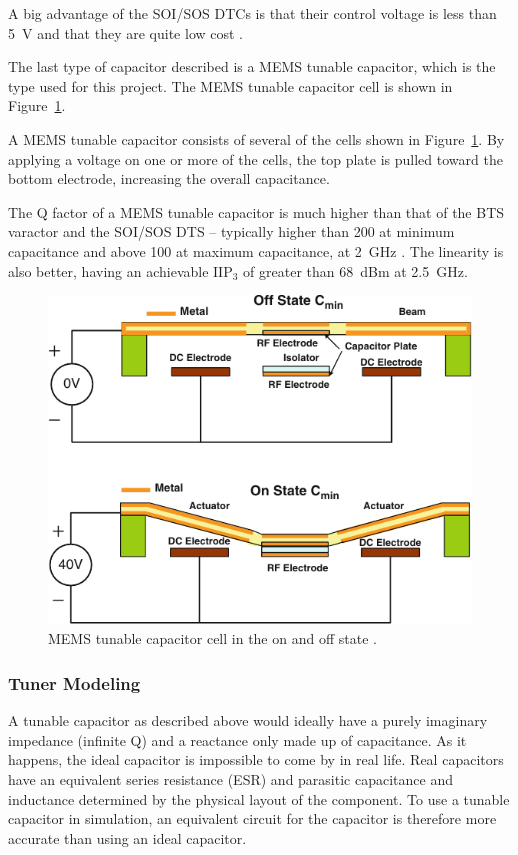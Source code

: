 A big advantage of the SOI/SOS DTCs is that their control voltage is less than \SI{5}{V} and that they are quite low cost \cite{gu2014rf}.

The last type of capacitor described is a MEMS tunable capacitor, which is the type used for this project. The MEMS tunable capacitor cell is shown in Figure~\ref{fig:memscap}.

A MEMS tunable capacitor consists of several of the cells shown in Figure~\ref{fig:memscap}. By applying a voltage on one or more of the cells, the top plate is pulled toward the bottom electrode, increasing the overall capacitance. 

The Q factor of a MEMS tunable capacitor is much higher than that of the BTS varactor and the SOI/SOS DTS -- typically higher than 200 at minimum capacitance and above 100 at maximum capacitance, at \SI{2}{GHz} \cite{gu2014rf}. The linearity is also better, having an achievable $\text{IIP}_3$ of greater than \SI{68}{dBm} at \SI{2.5}{GHz}. 

\begin{figure}[htbp]
    \centering
    \includegraphics{img/analysis/memscap}
    \caption{MEMS tunable capacitor cell in the on and off state \cite{gu2014rf}.}
    \label{fig:memscap}
\end{figure}

\subsubsection{Tuner Modeling}
A tunable capacitor as described above would ideally have a purely imaginary impedance (infinite Q) and a reactance only made up of capacitance. As it happens, the ideal capacitor is impossible to come by in real life. Real capacitors have an equivalent series resistance (ESR) and parasitic capacitance and inductance determined by the physical layout of the component. To use a tunable capacitor in simulation, an equivalent circuit for the capacitor is therefore more accurate than using an ideal capacitor.

